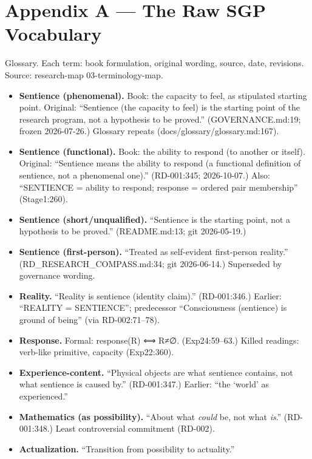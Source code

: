 \documentclass[
  11pt,
]{book}
\providecommand{\tightlist}{%
  \setlength{\itemsep}{0pt}\setlength{\parskip}{0pt}}
\begin{document}
\newpage

\chapter{Appendix A --- The Raw SGP
Vocabulary}\label{appendix-a-the-raw-sgp-vocabulary}

Glossary. Each term: book formulation, original wording, source, date,
revisions. Source: research-map 03-terminology-map.

\begin{itemize}
\tightlist
\item
  \textbf{Sentience (phenomenal).} Book: the capacity to feel, as
  stipulated starting point. Original: ``Sentience (the capacity to
  feel) is the starting point of the research program, not a hypothesis
  to be proved.'' (GOVERNANCE.md:19; frozen 2026-07-26.) Glossary
  repeats (docs/glossary/glossary.md:167).
\item
  \textbf{Sentience (functional).} Book: the ability to respond (to
  another or itself). Original: ``Sentience means the ability to respond
  (a functional definition of sentience, not a phenomenal one).''
  (RD-001:345; 2026-10-07.) Also: ``SENTIENCE = ability to respond;
  response = ordered pair membership'' (Stage1:260).
\item
  \textbf{Sentience (short/unqualified).} ``Sentience is the starting
  point, not a hypothesis to be proved.'' (README.md:13; git
  2026-05-19.)
\item
  \textbf{Sentience (first-person).} ``Treated as self-evident
  first-person reality.'' (RD\_RESEARCH\_COMPASS.md:34; git 2026-06-14.)
  Superseded by governance wording.
\item
  \textbf{Reality.} ``Reality is sentience (identity claim).''
  (RD-001:346.) Earlier: ``REALITY = SENTIENCE''; predecessor
  ``Consciousness (sentience) is ground of being'' (via RD-002:71--78).
\item
  \textbf{Response.} Formal: response(R) ⟺ R≠∅. (Exp24:59--63.) Killed
  readings: verb-like primitive, capacity (Exp22:360).
\item
  \textbf{Experience-content.} ``Physical objects are what sentience
  contains, not what sentience is caused by.'' (RD-001:347.) Earlier:
  ``the `world' as experienced.''
\item
  \textbf{Mathematics (as possibility).} ``About what \emph{could} be,
  not what \emph{is}.'' (RD-001:348.) Least controversial commitment
  (RD-002).
\item
  \textbf{Actualization.} ``Transition from possibility to actuality.''

\end{itemize}
\end{document}
